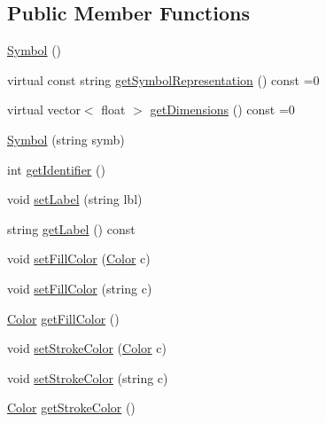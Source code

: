 \subsection*{Public Member Functions}
\begin{DoxyCompactItemize}
\item 
\hyperlink{classbridges_1_1datastructure_1_1_symbol_a6169106c021d20752abba3cd266ecfb0}{Symbol} ()
\item 
virtual const string \hyperlink{classbridges_1_1datastructure_1_1_symbol_a8044b3da559dcd9de8510ae339f126c8}{get\+Symbol\+Representation} () const =0
\item 
virtual vector$<$ float $>$ \hyperlink{classbridges_1_1datastructure_1_1_symbol_a5c1cb50770c4f4a2ff9c8642afc0d665}{get\+Dimensions} () const =0
\item 
\hyperlink{classbridges_1_1datastructure_1_1_symbol_adaeede160240bcc959d1813c5cb79528}{Symbol} (string symb)
\item 
int \hyperlink{classbridges_1_1datastructure_1_1_symbol_ac4b6cfcf91217d66ed0694080846970f}{get\+Identifier} ()
\item 
void \hyperlink{classbridges_1_1datastructure_1_1_symbol_a34609dd22e5043c39d40524d05e337b0}{set\+Label} (string lbl)
\item 
string \hyperlink{classbridges_1_1datastructure_1_1_symbol_a549906b96da5d53b964844ca5f593b7f}{get\+Label} () const
\item 
void \hyperlink{classbridges_1_1datastructure_1_1_symbol_a3019a17458fe5f0381cfd611338af6f7}{set\+Fill\+Color} (\hyperlink{classbridges_1_1datastructure_1_1_color}{Color} c)
\item 
void \hyperlink{classbridges_1_1datastructure_1_1_symbol_ad7b92720fe76b59f1922fe25c967f442}{set\+Fill\+Color} (string c)
\item 
\hyperlink{classbridges_1_1datastructure_1_1_color}{Color} \hyperlink{classbridges_1_1datastructure_1_1_symbol_a4b29601e24832077a15321af5c71cfdf}{get\+Fill\+Color} ()
\item 
void \hyperlink{classbridges_1_1datastructure_1_1_symbol_ad98bc6de925ff8ee2274298e42617fc8}{set\+Stroke\+Color} (\hyperlink{classbridges_1_1datastructure_1_1_color}{Color} c)
\item 
void \hyperlink{classbridges_1_1datastructure_1_1_symbol_af5f15111c67cfd63d3b0b3dc70442d0c}{set\+Stroke\+Color} (string c)
\item 
\hyperlink{classbridges_1_1datastructure_1_1_color}{Color} \hyperlink{classbridges_1_1datastructure_1_1_symbol_aa99d36f97deaf99bee1d61778c85e87d}{get\+Stroke\+Color} ()

\end{DoxyCompactItemize}
